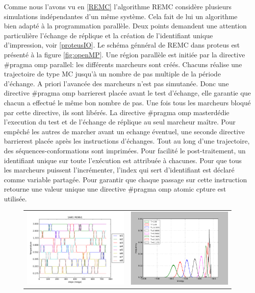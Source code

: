 Comme nous l'avons vu en \ref{REMC} l'algorithme REMC considère plusieurs simulations indépendantes d'un même système. Cela fait de lui un algorithme bien adapté à la programmation parallèle. Deux points demandent une attention particulière l'échange de réplique et la création de l'identifiant unique d'impression, voir \ref{proteusIO}. Le schéma génnéral de REMC dans proteus est présenté à la figure  \ref{fig:openMP}. Une région parallèle est initiée par la directive \og #pragma omp parallel\fg: les différents marcheurs sont créés. Chacuns réalise une trajectoire de type MC jusqu'à un nombre de pas multiple de la période d'échange. A priori l'avancée des marcheurs n'est pas simutanée. Donc une directive \og #pragma omp barrier\fg est placée avant le test d'échange, elle garantie que chacun a effectué le même bon nombre de pas. Une fois tous les marcheurs bloqué par cette directive, ils sont libérés. La directive \og #pragma omp master\fg dédie l'execution du test et de l'échange de réplique au seul marcheur maître. Pour empêché les autres de marcher avant un echange éventuel, une seconde directive \og barrier\fg est placée après les instructions d'échanges. Tout au long d'une trajectoire, des séquences-conformations sont imprimées. Pour facilité le post-traitement, un identifiant unique sur toute l'exécution est attribuée à chacunes. Pour que tous les marcheurs puissent l'incrémenter, l'index qui sert d'identifiant est déclaré comme variable partagée. Pour garantir que chaque passage sur cette instruction retourne une valeur unique une directive \og#pragma omp atomic cpture \fg est utilisée.
 
   \begin{figure}[!htbp]
     \centering
     \begin{tabular}{cc}
       \includegraphics[width=8cm]{figure/re8_Ttraj.png}  &
       \includegraphics[width=8cm]{figure/re8_distri.png}  &
     \end{tabular}     
     \caption{\textbt{}}
\label{fig:PDB}
   \end{figure}
   

